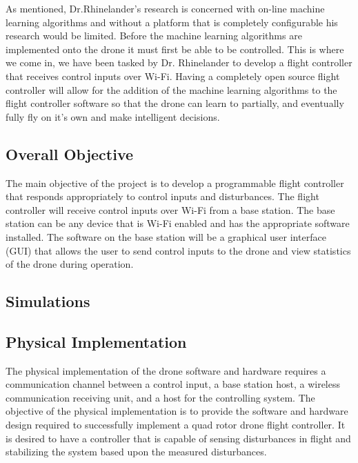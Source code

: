 As mentioned, Dr.Rhinelander's research is concerned with on-line machine learning algorithms and without a platform that is completely configurable his research would be limited. Before the machine learning algorithms are implemented onto the drone it must first be able to be controlled. This is where we come in, we have been tasked by Dr. Rhinelander to develop a flight controller that receives control inputs over Wi-Fi. Having a completely open source flight controller will allow for the addition of the machine learning algorithms to the flight controller software so that the drone can learn to partially, and eventually fully fly on it's own and make intelligent decisions.

\subsection{Overall Objective}

The main objective of the project is to develop a programmable flight controller that responds appropriately to control inputs and disturbances. The flight controller will receive control inputs over Wi-Fi from a base station. The base station can be any device that is Wi-Fi enabled and has the appropriate software installed. The software on the base station will be a graphical user interface (GUI) that allows the user to send control inputs to the drone and view statistics of the drone during operation.


\subsection{Simulations}




\subsection{Physical Implementation}


The physical implementation of the drone software and hardware requires a communication channel between a control input, a base station host, a wireless communication receiving unit, and a host for the controlling system. The objective of the physical implementation is to provide the software and hardware design required to successfully implement a quad rotor drone flight controller. It is desired to have a controller that is capable of sensing disturbances in flight and stabilizing the system based upon the measured disturbances.

